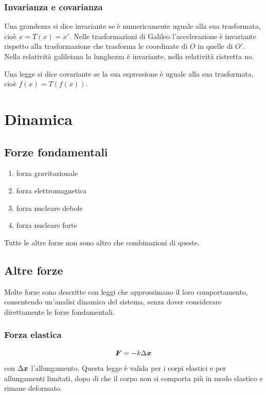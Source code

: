 \subsection{Invarianza e covarianza}
Una grandezza si dice invariante se è numericamente uguale alla sua trasformata, cioè $x=T(x)=x'$. Nelle trasformazioni di Galileo l'accelerazione è invariante rispetto alla trasformazione che trasforma le coordinate di $O$ in quelle di $O'$. Nella relatività galileiana la lunghezza è invariante, nella relatività ristretta no.

Una legge si dice covariante se la sua espressione è uguale alla sua trasformata, cioè $f(x)=T(f(x))$.




\chapter{Dinamica}
\minitoc

\section{Forze fondamentali}
\begin{enumerate}
\item forza gravitazionale
\item forza elettromagnetica
\item forza nucleare debole
\item forza nucleare forte
\end{enumerate}
Tutte le altre forze non sono altro che combinazioni di queste.
\section{Altre forze}
Molte forze sono descritte con leggi che approssimano il loro comportamento, consentendo un'analisi dinamica del sistema, senza dover considerare direttamente le forze fondamentali.

\subsection{Forza elastica}
\begin{legge}[Hook]
\begin{equation*}
\boldsymbol{F}=-k\Delta\boldsymbol{x}
\end{equation*}
 con $\Delta\boldsymbol{x}$ l'allungamento. Questa legge è valida per i corpi elastici e per allungamenti limitati, dopo di che il corpo non si comporta più in modo elastico e rimane deformato.
\end{legge}

